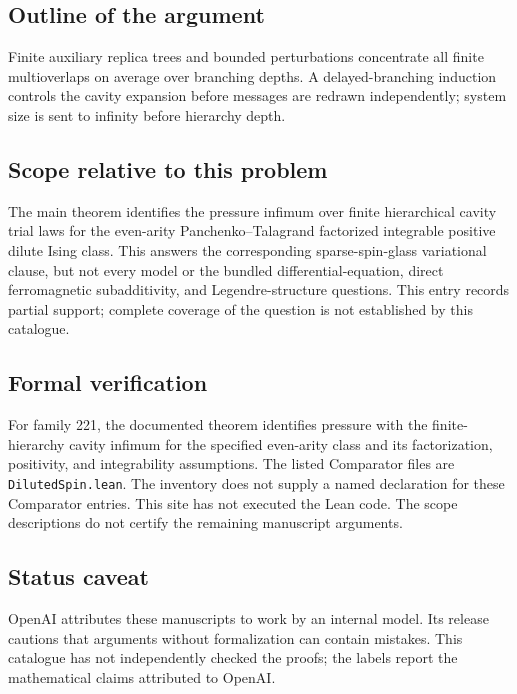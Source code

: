 \documentclass[11pt]{article}
\begin{document}
\subsection{Outline of the argument}
Finite auxiliary replica trees and bounded perturbations concentrate all finite multioverlaps on average over branching depths. A delayed-branching induction controls the cavity expansion before messages are redrawn independently; system size is sent to infinity before hierarchy depth.

\subsection{Scope relative to this problem}
The main theorem identifies the pressure infimum over finite hierarchical cavity trial laws for the even-arity Panchenko–Talagrand factorized integrable positive dilute Ising class. This answers the corresponding sparse-spin-glass variational clause, but not every model or the bundled differential-equation, direct ferromagnetic subadditivity, and Legendre-structure questions. This entry records partial support; complete coverage of the question is not established by this catalogue.

\subsection{Formal verification}
For family 221, the documented theorem identifies pressure with the finite-hierarchy cavity infimum for the specified even-arity class and its factorization, positivity, and integrability assumptions. The listed Comparator files are \texttt{DilutedSpin.lean}. The inventory does not supply a named declaration for these Comparator entries. This site has not executed the Lean code. The scope descriptions do not certify the remaining manuscript arguments.

\subsection{Status caveat}
OpenAI attributes these manuscripts to work by an internal model. Its release cautions that arguments without formalization can contain mistakes. This catalogue has not independently checked the proofs; the labels report the mathematical claims attributed to OpenAI.
\end{document}
